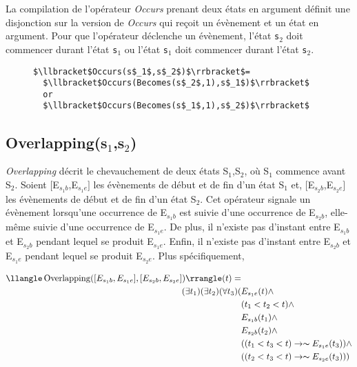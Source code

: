 La compilation de l'opérateur {\em Occurs} prenant deux états en argument définit une disjonction sur la version de {\em Occurs} qui reçoit un évènement et un état en argument.
Pour que l'opérateur déclenche un évènement, l'état {\tt s$_2$} doit commencer durant l'état {\tt s$_1$} ou l'état {\tt s$_1$} doit commencer durant l'état {\tt s$_2$}.
\begin{figure}
\begin{lstlisting}[language=EPLPseudoCodeCompile]
$\llbracket$Occurs(s$_1$,s$_2$)$\rrbracket$=
  $\llbracket$Occurs(Becomes(s$_2$,1),s$_1$)$\rrbracket$
  or 
  $\llbracket$Occurs(Becomes(s$_1$,1),s$_2$)$\rrbracket$
\end{lstlisting}
\end{figure}

\subsection*{Overlapping(s$_1$,s$_2$)}
{\em Overlapping} décrit le chevauchement de deux états S$_1$,S$_2$, où S$_1$ commence avant S$_2$. 
Soient $[$E$_{s_{1}b}$,E$_{s_{1}e}]$ les évènements de début et de fin d'un 
état S$_1$ et,  $[$E$_{s_{2}b}$,E$_{s_{2}e}]$ les évènements de début et de 
fin d'un état S$_2$. 
Cet opérateur signale un évènement lorsqu'une occurrence de E$_{s_{1}b}$ est suivie d'une occurrence de E$_{s_{2}b}$, elle-même suivie d'une occurrence de E$_{s_{1}e}$.
De plus, il n'existe pas d'instant entre E$_{s_{1}b}$ et E$_{s_{2}b}$ pendant lequel se produit E$_{s_{1}e}$. Enfin, il n'existe pas d'instant entre E$_{s_{2}b}$ et E$_{s_{1}e}$ pendant lequel se produit E$_{s_{2}e}$. Plus spécifiquement,
\begin{small}
\begin{equation*}
\begin{split}
\llangle\operatorname{Overlapping}([E_{s_{1}b},E_{s_{1}e}],[E_{s_{2}b},E_{s_{2}e}])\rrangle(t)=&\\
(\exists t_1)(\exists t_2)(\forall t_3)(& E_{s_{1}e}(t)\wedge \\
&(t_1<t_2<t)\wedge \\
&E_{s_{1}b}(t_1)\wedge\\
&E_{s_{2}b}(t_2)\wedge\\
&((t_1<t_3 < t)\rightarrow  \thicksim E_{s_{1}e}(t_3)) \wedge \\
&((t_2<t_3 < t)\rightarrow  \thicksim E_{s_{2}e}(t_3)))%
\end{split}
\end{equation*}
\end{small}

